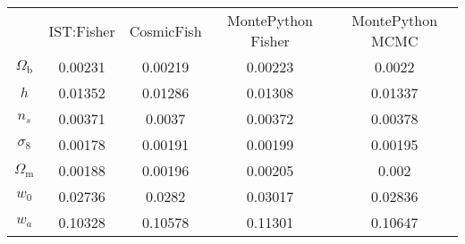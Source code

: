 \begin{table}
\centering
\begin{tabular}{|c|c|c|c|c|}
 & IST:Fisher & CosmicFish & MontePython Fisher & MontePython MCMC \\
$\Omega_\mathrm{b}$ & 0.00231 & 0.00219 & 0.00223 & 0.0022 \\
$h$ & 0.01352 & 0.01286 & 0.01308 & 0.01337 \\
$n_s$ & 0.00371 & 0.0037 & 0.00372 & 0.00378 \\
$\sigma_8$ & 0.00178 & 0.00191 & 0.00199 & 0.00195 \\
$\Omega_\mathrm{m}$ & 0.00188 & 0.00196 & 0.00205 & 0.002 \\
$w_0$ & 0.02736 & 0.0282 & 0.03017 & 0.02836 \\
$w_a$ & 0.10328 & 0.10578 & 0.11301 & 0.10647 \\
\end{tabular}
\end{table}
